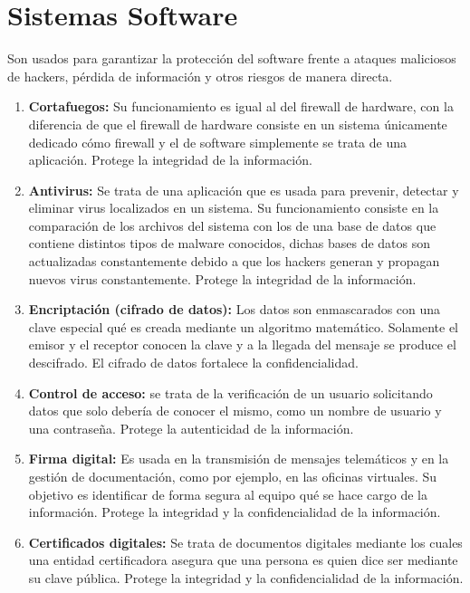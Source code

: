 \section{Sistemas Software}
Son usados para garantizar la protección del software frente a ataques maliciosos de hackers, pérdida de información y otros riesgos de manera directa.
\begin{enumerate}
\item {\bfseries Cortafuegos:}
Su funcionamiento es igual al del firewall de hardware, con la diferencia de que el firewall de hardware consiste en un sistema únicamente dedicado cómo firewall y el de software simplemente se trata de una aplicación. Protege la integridad de la información. 

\item {\bfseries Antivirus:}
Se trata de una aplicación que es usada para prevenir, detectar y eliminar virus localizados en un sistema. Su funcionamiento consiste en la comparación de los archivos del sistema con los de una base de datos que contiene distintos tipos de malware conocidos, dichas bases de datos son actualizadas constantemente debido a que los hackers generan y propagan nuevos virus constantemente. Protege la integridad de la información.\cite{antivirus}
\item {\bfseries Encriptación (cifrado de datos):}
Los datos son enmascarados con una clave especial qué es creada mediante un algoritmo matemático. Solamente el emisor y el receptor conocen la clave y a la llegada del mensaje se produce el descifrado. El cifrado de datos fortalece la confidencialidad. 
\item {\bfseries Control de acceso:}
se trata de la verificación de un usuario solicitando datos que solo debería de conocer el mismo, como un nombre de usuario y una contraseña. Protege la autenticidad de la información. 
\item {\bfseries Firma digital:}
Es usada en la transmisión de mensajes telemáticos y en la gestión de documentación, como por ejemplo, en las oficinas virtuales. Su objetivo es identificar de forma segura al equipo qué se hace cargo de la información. Protege la integridad y la confidencialidad de la información.
\item {\bfseries Certificados digitales:}
Se trata de documentos digitales mediante los cuales una entidad certificadora asegura que una persona es quien dice ser mediante su clave pública. Protege la integridad y la confidencialidad de la información. \cite{certificado}

\end{enumerate}



\nocite{ransomware}
\nocite{sql_injection}
\nocite{vulnerabilidades}
\nocite{vulnerabilidades2}
\nocite{wikip}
\nocite{comision_europea}
\nocite{isot}
\nocite{gestion_activos}
\nocite{incibe2}
\nocite{herramientas-evaluacion-riesgos}
\nocite{bibdigital}
\nocite{bibdigital}

\nocite{xss2}
\nocite{pri}








